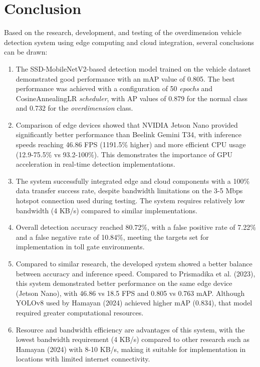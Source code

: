 \section{Conclusion}
\label{sec:conclusion}

Based on the research, development, and testing of the overdimension vehicle detection system using edge computing and cloud integration, several conclusions can be drawn:

\begin{enumerate}[nolistsep]
  \item The SSD-MobileNetV2-based detection model trained on the vehicle dataset demonstrated good performance with an mAP value of 0.805. The best performance was achieved with a configuration of 50 \emph{epochs} and CosineAnnealingLR \emph{scheduler}, with AP values of 0.879 for the normal class and 0.732 for the \emph{overdimension} class.
  \item Comparison of edge devices showed that NVIDIA Jetson Nano provided significantly better performance than Beelink Gemini T34, with inference speeds reaching 46.86 FPS (1191.5\% higher) and more efficient CPU usage (12.9-75.5\% vs 93.2-100\%). This demonstrates the importance of GPU acceleration in real-time detection implementations.
  \item The system successfully integrated edge and cloud components with a 100\% data transfer success rate, despite bandwidth limitations on the 3-5 Mbps hotspot connection used during testing. The system requires relatively low bandwidth (4 KB/s) compared to similar implementations.
  \item Overall detection accuracy reached 80.72\%, with a false positive rate of 7.22\% and a false negative rate of 10.84\%, meeting the targets set for implementation in toll gate environments.
  \item Compared to similar research, the developed system showed a better balance between accuracy and inference speed. Compared to Prismadika et al. (2023), this system demonstrated better performance on the same edge device (Jetson Nano), with 46.86 vs 18.5 FPS and 0.805 vs 0.763 mAP. Although YOLOv8 used by Hamayan (2024) achieved higher mAP (0.834), that model required greater computational resources.
  \item Resource and bandwidth efficiency are advantages of this system, with the lowest bandwidth requirement (4 KB/s) compared to other research such as Hamayan (2024) with 8-10 KB/s, making it suitable for implementation in locations with limited internet connectivity.
\end{enumerate}


